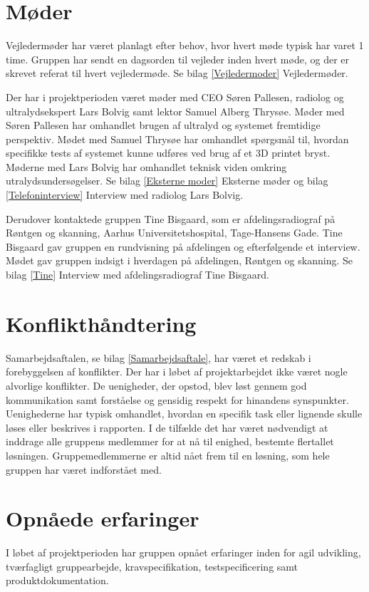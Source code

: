 \section{Møder}
Vejledermøder har været planlagt efter behov, hvor hvert møde typisk har varet 1 time. Gruppen har sendt en dagsorden til vejleder inden hvert møde, og der er skrevet referat til hvert vejledermøde. Se bilag \ref{Vejledermoder} Vejledermøder.
 
Der har i projektperioden været møder med CEO Søren Pallesen, radiolog og ultralydsekspert Lars Bolvig samt lektor Samuel Alberg Thrysøe. Møder med Søren Pallesen har omhandlet brugen af ultralyd og systemet fremtidige perspektiv. Mødet med Samuel Thrysøe har omhandlet spørgsmål til, hvordan specifikke tests af systemet kunne udføres ved brug af et 3D printet bryst. Møderne med Lars Bolvig har omhandlet teknisk viden omkring utralydsundersøgelser. Se bilag \ref{Eksterne moder} Eksterne møder og bilag \ref{Telefoninterview} Interview med radiolog Lars Bolvig. 

Derudover kontaktede gruppen Tine Bisgaard, som er afdelingsradiograf på Røntgen og skanning, Aarhus Universitetshospital, Tage-Hansens Gade. Tine Bisgaard gav gruppen en rundvisning på afdelingen og efterfølgende et interview. Mødet gav gruppen indsigt i hverdagen på afdelingen, Røntgen og skanning. Se bilag \ref{Tine} Interview med afdelingsradiograf Tine Bisgaard. 

\section{Konflikthåndtering}
Samarbejdsaftalen, se bilag \ref{Samarbejdsaftale}, har været et redskab i forebyggelsen af konflikter. Der har i løbet af projektarbejdet ikke været nogle alvorlige konflikter. De uenigheder, der opstod, blev løst gennem god kommunikation samt forståelse og gensidig respekt for hinandens synspunkter. Uenighederne har typisk omhandlet, hvordan en specifik task eller lignende skulle løses eller beskrives i rapporten. I de tilfælde det har været nødvendigt at inddrage alle gruppens medlemmer for at nå til enighed, bestemte flertallet løsningen. Gruppemedlemmerne er altid nået frem til en løsning, som hele gruppen har været indforstået med.

\section{Opnåede erfaringer}
I løbet af projektperioden har gruppen opnået erfaringer inden for agil udvikling, tværfagligt gruppearbejde, kravspecifikation, testspecificering samt produktdokumentation.

